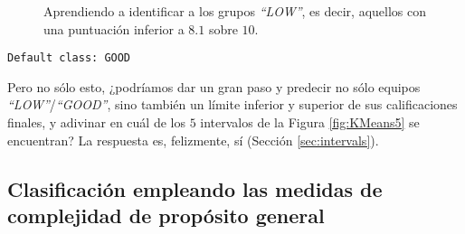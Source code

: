 \begin{figure}[H]
\centering
{}
\caption{Aprendiendo a identificar a los grupos \emph{``LOW''}, es decir, aquellos con una puntuación inferior a $8.1$ sobre $10$.}
\label{fig:cmbegin1}
\end{figure}

\begin{tcolorbox}[title=Reglas de clasificación para identificar grupos de tipo \emph{``LOW''}.]
  \makeatletter
  \makeatother
\begin{multicols}{2}
    \begin{verbatim}
Default class: GOOD
    \end{verbatim}
  \end{multicols}
\label{rulesbegin1}
\end{tcolorbox}

Pero no sólo esto, ¿podríamos dar un gran paso y predecir no sólo equipos \emph{``LOW''}/\emph{``GOOD''}, sino también un límite inferior y superior de sus calificaciones finales, y adivinar en cuál de los $5$ intervalos de la Figura \ref{fig:KMeans5} se encuentran? La respuesta es, felizmente, sí (Sección \ref{sec:intervals}).

\subsection{Clasificación empleando las medidas de complejidad de propósito general}

